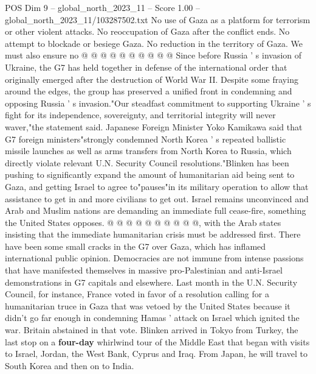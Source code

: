 \begin{textsample}{POS Dim 9 – global\_north\_2023\_11 – Score 1.00 – global\_north\_2023\_11/103287502.txt}
No use of Gaza as a platform for terrorism or other violent attacks.
No reoccupation of Gaza after the conflict ends.
No attempt to blockade or besiege Gaza.
No reduction in the territory of Gaza.
We must also ensure no @ @ @ @ @ @ @ @ @ @ Since before Russia ' s invasion of Ukraine, the G7 has held together in defense of the international order that originally emerged after the destruction of World War II.
Despite some fraying around the edges, the group has preserved a unified front in condemning and opposing Russia ' s invasion."Our steadfast commitment to supporting Ukraine ' s fight for its independence, sovereignty, and territorial integrity will never waver,"the statement said.
Japanese Foreign Minister Yoko Kamikawa said that G7 foreign ministers"strongly condemned North Korea ' s repeated ballistic missile launches as well as arms transfers from North Korea to Russia, which directly violate relevant U.N.
Security Council resolutions."Blinken has been pushing to significantly expand the amount of humanitarian aid being sent to Gaza, and getting Israel to agree to"pauses"in its military operation to allow that assistance to get in and more civilians to get out.
Israel remains unconvinced and Arab and Muslim nations are demanding an immediate full cease-fire, something the United States opposes. @ @ @ @ @ @ @ @ @ @, with the Arab states insisting that the immediate humanitarian crisis must be addressed first.
There have been some small cracks in the G7 over Gaza, which has inflamed international public opinion.
Democracies are not immune from intense passions that have manifested themselves in massive pro-Palestinian and anti-Israel demonstrations in G7 capitals and elsewhere.
Last month in the U.N.
Security Council, for instance, France voted in favor of a resolution calling for a humanitarian truce in Gaza that was vetoed by the United States because it didn't go far enough in condemning Hamas ' attack on Israel which ignited the war.
Britain abstained in that vote.
Blinken arrived in Tokyo from Turkey, the last stop on a \textbf{four-day} whirlwind tour of the Middle East that began with visits to Israel, Jordan, the West Bank, Cyprus and Iraq.
From Japan, he will travel to South Korea and then on to India.

\end{textsample}
